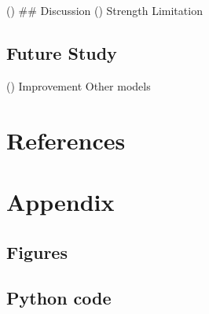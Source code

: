 \documentclass[10pt,letterpaper]{article}
\begin{document}
() \#\# Discussion () Strength Limitation

\subsection{Future Study}\label{future-study}

() Improvement Other models

\section*{References}\label{references}

\section{Appendix}\label{appendix}

\subsection{Figures}\label{figures}

\subsection{Python code}\label{python-code}

\nolinenumbers
\end{document}
